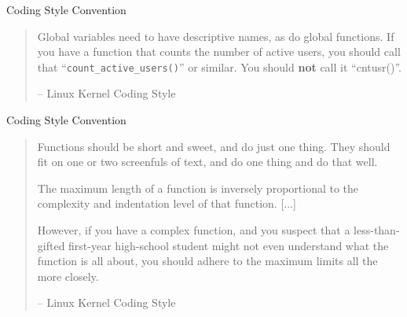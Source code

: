 \documentclass[compress]{beamer}
\begin{document}
\begin{slide}
	\begin{block}{Coding Style Convention}

	\begin{quotation} \scriptsize \normalfont

	Global variables need to have descriptive names, as do global functions.
	If you have a function that counts the number of active users, you should
	call that ``\texttt{count\_active\_users()}'' or similar. You should \textbf{not} call it ``cntusr()''.

	\begin{flushright}-- Linux Kernel Coding Style\end{flushright}

	\end{quotation}

	\end{block}
\end{slide}

\begin{slide}
	\begin{block}{Coding Style Convention}

	\begin{quotation} \scriptsize \normalfont

	Functions should be short and sweet, and do just one thing.
	They should fit on one or two screenfuls of text, and do one thing and do that well.

	The maximum length of a function is inversely proportional to the
	complexity and indentation level of that function.
	[...]

	However, if you have a complex function, and you suspect that a less-than-gifted first-year high-school student might not even understand what the function is all about, you should adhere to the maximum limits all the more closely.

	\begin{flushright}-- Linux Kernel Coding Style\end{flushright}

	\end{quotation}

	\end{block}
\end{slide}
\end{document}
